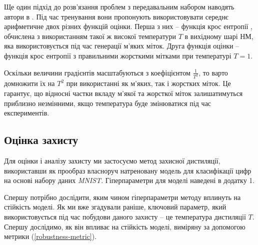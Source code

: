 \documentclass[14pt,a4paper]{extarticle}
\newcounter{e}
\numberwithin{equation}{section}
\numberwithin{figure}{section}
\begin{document}
 Ще один підхід до розв'язання проблем з передавальним набором наводять автори в \cite{distillation}. Під час тренування вони пропонують використовувати середнє арифметичне двох різних функцій оцінки. Перша з них -- функція крос ентропії 
 , обчислена з використанням такої ж високої температури $T$ в вихідному шарі НМ, яка використовується під час генерації м'яких міток. Друга функція оцінки -- функція крос ентропії з правильними жорсткими мітками при температурі $T=1$.
 
 
 Оскільки величини градієнтів масштабуються з коефіцієнтом $\frac{1}{T^2}$, то варто домножити їх на $T^2$ при використанні як м'яких, так і жорстких міток. Це гарантує, що відносні частки вкладу м'якої та жорсткої міток залишатимуться приблизно незмінними, якщо температура буде змінюватися під час експериментів.
 

 
 \subsection{Оцінка захисту}
 Для оцінки і аналізу захисту ми застосуємо метод захисної дистиляції, використавши як прообраз власноруч натреновану модель для класифікації цифр на основі набору даних \textit{MNIST}. Гіперпараметри для моделі наведені в додатку 1.
 
 Спершу потрібно дослідити, яким чином гіперпараметри методу вплинуть на стійкість моделі. Як ми вже згадували раніше, ключовий параметр, який використовується під час побудови даного захисту -- це температура дистиляції $T$. Спершу дослідимо, як він впливає на стійкість моделі, виміряну за допомогою метрики (\ref{robustness-metric}).
 
\end{document}
